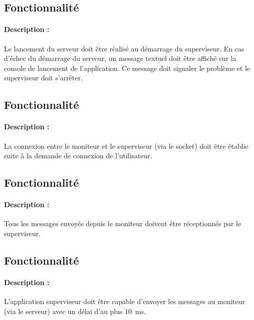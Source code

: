 \documentclass[11pt, a4paper]{paper}
\newcounter{cptreq}
\begin{document}
{\color{black}
\subsection{Fonctionnalité \thecptreq *}

\paragraph{Description :} Le lancement du serveur doit être réalisé au démarrage du superviseur. En cas d'échec du démarrage du serveur, un message textuel doit être  affiché sur la console de lancement de l'application. Ce message doit signaler le problème et le superviseur doit s'arrêter.

}
{\color{black}
\subsection{Fonctionnalité \thecptreq *}

\paragraph{Description :} La connexion entre le moniteur et le superviseur (via le socket) doit être établie suite à la demande de connexion de l'utilisateur.

{\color{black}
\subsection{Fonctionnalité \thecptreq *}

\paragraph{Description :} Tous les messages envoyés depuis le moniteur doivent être réceptionnés par le superviseur.

\subsection{Fonctionnalité \thecptreq *}

\paragraph{Description :} L'application superviseur doit être capable d'envoyer les messages au moniteur (via le serveur) avec un délai d'au plus 10~ms.

}}
\end{document}

